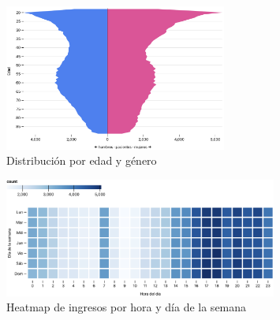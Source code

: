 \begin{figure}[H]
  \centering
  \includegraphics[width=0.65\textwidth]{imagenes/chart3.png}
  \caption{Distribución por edad y género}
  \label{fig:chart3}
\end{figure}






\begin{figure}[H]
  \centering
  \includegraphics[width=0.8\textwidth]{imagenes/chart4.png}
  \caption{Heatmap de ingresos por hora y día de la semana}
  \label{fig:chart4}
\end{figure}


